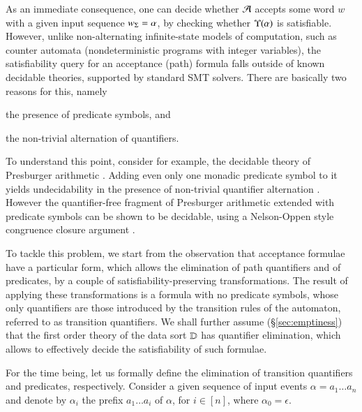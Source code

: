 As an immediate consequence, one can decide whether $\mathcal{A}$ accepts some
word $w$ with a given input sequence ${w}_\Sigma=\alpha$, by checking
whether $\Upsilon({\alpha})$ is satisfiable. However, unlike
non-alternating infinite-state models of computation, such as counter
automata (nondeterministic programs with integer variables), the
satisfiability query for an acceptance (path) formula falls outside of
known decidable theories, supported by standard SMT solvers. There are
basically two reasons for this, namely\begin{inparaenum}[(i)]
\item the presence of predicate symbols, and
\item the non-trivial alternation of quantifiers.
\end{inparaenum}
To understand this point, consider for example, the decidable theory
of Presburger arithmetic \cite{Presburger29}. Adding even only one
monadic predicate symbol to it yields undecidability in the presence
of non-trivial quantifier alternation \cite{Halpern91}. However the
quantifier-free fragment of Presburger arithmetic extended with
predicate symbols can be shown to be decidable, using a Nelson-Oppen
style congruence closure argument \cite{NelsonOppen80}.

To tackle this problem, we start from the observation that acceptance
formulae have a particular form, which allows the elimination of path
quantifiers and of predicates, by a couple of
satisfiability-preserving transformations. The result of applying
these transformations is a formula with no predicate symbols, whose
only quantifiers are those introduced by the transition rules of the
automaton, referred to as transition quantifiers. We shall further
assume (\S\ref{sec:emptiness}) that the first order theory of the data
sort $\mathbb{D}$ has quantifier elimination, which allows to effectively
decide the satisfiability of such formulae.

For the time being, let us formally define the elimination of
transition quantifiers and predicates, respectively. Consider a given
sequence of input events $\alpha = a_1 \ldots a_n$ and denote by
$\alpha_i$ the prefix $a_1 \ldots a_i$ of $\alpha$, for $i \in [n]$,
where $\alpha_0=\epsilon$.

